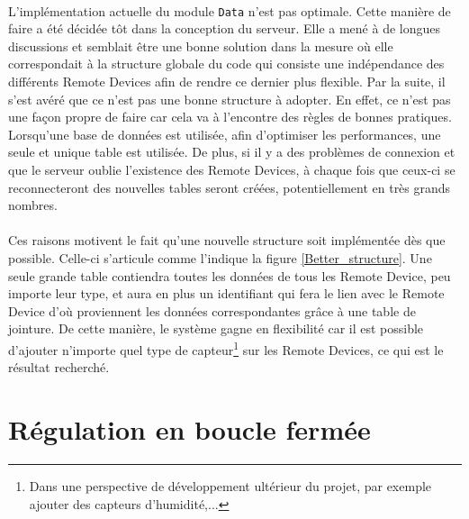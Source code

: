 \documentclass[11pt,a4paper,11pt]{report}
\begin{document}
\paragraph*{}
	L'implémentation actuelle du module \texttt{Data} n'est pas optimale. Cette manière de faire a été décidée tôt dans la conception du serveur. Elle a mené à de longues discussions et semblait être une bonne solution dans la mesure où elle correspondait à la structure globale du code qui consiste une indépendance des différents Remote Devices afin de rendre ce dernier plus flexible. Par la suite, il s'est avéré que ce n'est pas une bonne structure à adopter. En effet, ce n'est pas une façon propre de faire car cela va à l'encontre des règles de bonnes pratiques. Lorsqu'une base de données est utilisée, afin d'optimiser les performances, une seule et unique table est utilisée. De plus, si il y a des problèmes de connexion et que le serveur oublie l'existence des Remote Devices, à chaque fois que ceux-ci se reconnecteront des nouvelles tables seront créées, potentiellement en très grands nombres.
    
\paragraph*{}
	Ces raisons motivent le fait qu'une nouvelle structure soit implémentée dès que possible. Celle-ci s'articule comme l'indique la figure \ref{Better_structure}. Une seule grande table contiendra toutes les données de tous les Remote Device, peu importe leur type, et aura en plus un identifiant qui fera le lien avec le Remote Device d'où proviennent les données correspondantes grâce à une table de jointure. De cette manière, le système gagne en flexibilité car il est possible d'ajouter n'importe quel type de capteur\footnote{Dans une perspective de développement ultérieur du projet, par exemple ajouter des capteurs d'humidité,...} sur les Remote Devices, ce qui est le résultat recherché.
    
\fi




\section{Régulation en boucle fermée}
\end{document}

